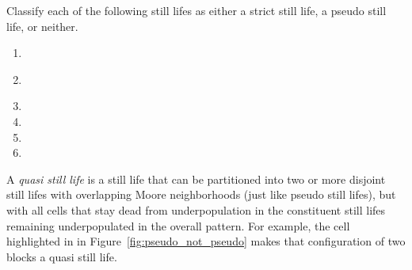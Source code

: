 \vspace*{-0.4cm}\hrulefill\vspace*{-0.3cm}\footnotesize\begin{multicols}{2}\vspace*{-0.4cm}\raggedcolumns{}
	\setlength{\parskip}{0pt}
	
	\begin{problemstar}\label{exer:classify_still_lifes}
		Classify each of the following still lifes as either a strict still life, a pseudo still life, or neither.\setlength{\columnsep}{0pt}\vspace*{-0.25cm}
		
		\begin{multicols}{2}
			\begin{enumerate}
				\item[\bf\color{ocre}(a)] \\[0.2em]
				
				\item[\bf\color{ocre}(c)] \\[0.9em]
				
				\item[\bf\color{ocre}(e)] 
				
				\item[\bf\color{ocre}(b)] 
				
				\item[\bf\color{ocre}(d)] 
				
				\item[\bf\color{ocre}(f)] 
			\end{enumerate}
		\end{multicols}
	\end{problemstar}
	
	
	\mfilbreak
	
	
	\begin{problem}\label{exer:quasi_still_life}
		A \emph{quasi still life} is a still life that can be partitioned into two or more disjoint still lifes with overlapping Moore neighborhoods (just like pseudo still lifes), but with all cells that stay dead from underpopulation in the constituent still lifes remaining underpopulated in the overall pattern. For example, the cell highlighted in  in Figure~\ref{fig:pseudo_not_pseudo} makes that configuration of two blocks a quasi still life.\smallskip
		

\end{problem}
\end{multicols}
